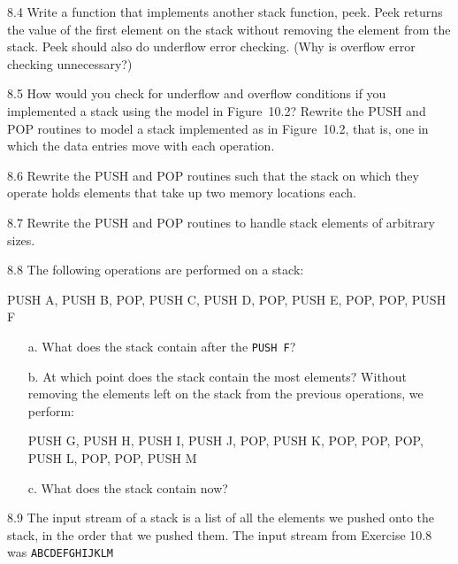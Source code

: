 \documentclass{patt}
\begin{document}
\begin{exercises}
\item [8.4]
  Write a function that implements another stack function, peek. Peek
  returns the value of the first element on the stack without removing
  the element from the stack. Peek should also do underflow error
  checking. (Why is overflow error checking unnecessary?)

\item [8.5]
  How would you check for underflow and overflow conditions if you
  implemented a stack using the model in Figure~10.2?  Rewrite the
  PUSH and POP routines to model a stack implemented as in 
  Figure~10.2, that is, one in which the data entries move with 
  each operation.

\item [8.6]
  Rewrite the PUSH and POP routines such that the stack on which they
  operate holds elements that take up two memory locations each.

\item [8.7]
  Rewrite the PUSH and POP routines to handle stack elements of
  arbitrary sizes.

\item [8.8]
  The following operations are performed on a stack:

\begin{colorverbatim}
PUSH A, PUSH B, POP, PUSH C, PUSH D, POP, PUSH E,
POP, POP, PUSH F
\end{colorverbatim}

\begin{enumerate}[a.]
\item[a.] What does the stack contain after the
  \texttt{PUSH F}?

\item[b.] At which point does the stack contain the most elements?
  Without removing the elements left on the stack from the previous
  operations, we perform:

\begin{colorverbatim}
PUSH G, PUSH H, PUSH I, PUSH J, POP, PUSH K,
POP, POP, POP, PUSH L, POP, POP, PUSH M
\end{colorverbatim}

\item[c.] What does the stack contain now?
\end{enumerate}

\item [8.9]
  The input stream of a stack is a list of all the elements we pushed
  onto the stack, in the order that we pushed them. The input stream
  from Exercise 10.8 was \verb|ABCDEFGHIJKLM|


\end{exercises}
\end{document}
